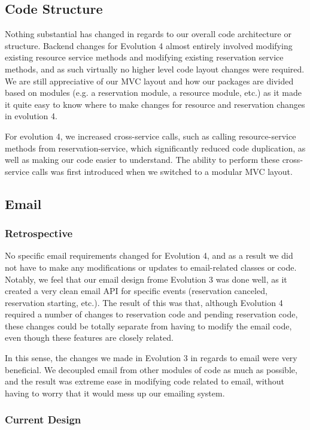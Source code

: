 \documentclass[12pt]{article}
\begin{document}
\subsection{Code Structure}
Nothing substantial has changed in regards to our overall code architecture or structure. Backend changes for Evolution 4 almost entirely involved modifying existing resource service methods and modifying existing reservation service methods, and as such virtually no higher level code layout changes were required. We are still appreciative of our MVC layout and how our packages are divided based on modules (e.g. a reservation module, a resource module, etc.) as it made it quite easy to know where to make changes for resource and reservation changes in evolution 4. 


For evolution 4, we increased cross-service calls, such as calling resource-service methods from reservation-service, which significantly reduced code duplication, as well as making our code easier to understand. The ability to perform these cross-service calls was first introduced when we switched to a modular MVC layout. 


\subsection{Email}
\subsubsection{Retrospective}

No specific email requirements changed for Evolution 4, and as a result we did not have to make any modifications or updates to email-related classes or code. Notably, we feel that our email design frome Evolution 3 was done well, as it created a very clean email API for specific events (reservation canceled, reservation starting, etc.). The result of this was that, although Evolution 4 required a number of changes to reservation code and pending reservation code, these changes could be totally separate from having to modify the email code, even though these features are closely related. 


In this sense, the changes we made in Evolution 3 in regards to email were very beneficial. We decoupled email from other modules of code as much as possible, and the result was extreme ease in modifying code related to email, without having to worry that it would mess up our emailing system. 


\subsubsection{Current Design}
\end{document}
